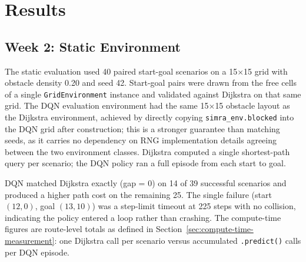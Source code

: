 \section{Results}
\label{sec:results}

\subsection{Week 2: Static Environment}

The static evaluation used 40 paired start-goal scenarios on a 15$\times$15 grid with obstacle density 0.20 and seed 42. Start-goal pairs were drawn from the free cells of a single \texttt{GridEnvironment} instance and validated against Dijkstra on that same grid. The DQN evaluation environment had the same 15$\times$15 obstacle layout as the Dijkstra environment, achieved by directly copying \texttt{simra\_env.blocked} into the DQN grid after construction; this is a stronger guarantee than matching seeds, as it carries no dependency on RNG implementation details agreeing between the two environment classes. Dijkstra computed a single shortest-path query per scenario; the DQN policy ran a full episode from each start to goal.

\begin{table}[h]
\centering
\caption{Week 2 Static Evaluation Summary (40 scenarios).}
\end{table}

DQN matched Dijkstra exactly (gap = 0) on 14 of 39 successful scenarios and produced a higher path cost on the remaining 25. The single failure (start $(12,0)$, goal $(13,10)$) was a step-limit timeout at 225 steps with no collision, indicating the policy entered a loop rather than crashing. The compute-time figures are route-level totals as defined in Section~\ref{sec:compute-time-measurement}: one Dijkstra call per scenario versus accumulated \texttt{.predict()} calls per DQN episode.


